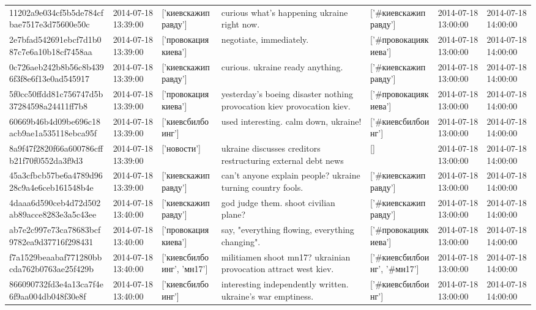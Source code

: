 \begin{tabular}{lllllll}
11202a9e034cf5b5de784cfbae7517e3d75600e50c & 2014-07-18 13:39:00 & ['киевскажиправду'] & curious what's happening ukraine right now. & ['#киевскажиправду'] & 2014-07-18 13:00:00 & 2014-07-18 14:00:00 \\
2e7bfad542691ebcf7d1b087c7e6a10b18cf7458aa & 2014-07-18 13:39:00 & ['провокациякиева'] & negotiate, immediately. & ['#провокациякиева'] & 2014-07-18 13:00:00 & 2014-07-18 14:00:00 \\
0c726aeb242b8b56c8b4396f3f8e6f13e0ad545917 & 2014-07-18 13:39:00 & ['киевскажиправду'] & curious. ukraine ready anything. & ['#киевскажиправду'] & 2014-07-18 13:00:00 & 2014-07-18 14:00:00 \\
5f0cc50ffdd81c756747d5b37284598a24411ff7b8 & 2014-07-18 13:39:00 & ['провокациякиева'] & yesterday's boeing disaster nothing provocation kiev provocation kiev. & ['#провокациякиева'] & 2014-07-18 13:00:00 & 2014-07-18 14:00:00 \\
60669b46b4d09be696c18acb9ae1a535118ebca95f & 2014-07-18 13:39:00 & ['киевсбилбоинг'] & used interesting. calm down, ukraine! & ['#киевсбилбоинг'] & 2014-07-18 13:00:00 & 2014-07-18 14:00:00 \\
8a9f47f2820f66a600786cffb21f70f0552da3f9d3 & 2014-07-18 13:39:00 & ['новости'] & ukraine discusses creditors restructuring external debt news & [] & 2014-07-18 13:00:00 & 2014-07-18 14:00:00 \\
45a3cfbcb57be6a4789d9628c9a4e6ceb161548b4e & 2014-07-18 13:39:00 & ['киевскажиправду'] & can't anyone explain people? ukraine turning country fools. & ['#киевскажиправду'] & 2014-07-18 13:00:00 & 2014-07-18 14:00:00 \\
4daaa6d590ceb4d72d502ab89acce8283e3a5c43ee & 2014-07-18 13:40:00 & ['киевскажиправду'] & god judge them. shoot civilian plane? & ['#киевскажиправду'] & 2014-07-18 13:00:00 & 2014-07-18 14:00:00 \\
ab7e2c997e73ca78683bcf9782ea9d37716f298431 & 2014-07-18 13:40:00 & ['провокациякиева'] & say, "everything flowing, everything changing". & ['#провокациякиева'] & 2014-07-18 13:00:00 & 2014-07-18 14:00:00 \\
f7a1529beaabaf771280bbcda762b0763ae25f429b & 2014-07-18 13:40:00 & ['киевсбилбоинг', 'мн17'] & militiamen shoot mn17? ukrainian provocation attract west kiev. & ['#киевсбилбоинг', '#мн17'] & 2014-07-18 13:00:00 & 2014-07-18 14:00:00 \\
866090732fd3e4a13ca7f4e6f9aa004db048f30e8f & 2014-07-18 13:40:00 & ['киевсбилбоинг'] & interesting independently written. ukraine's war emptiness. & ['#киевсбилбоинг'] & 2014-07-18 13:00:00 & 2014-07-18 14:00:00 \\

\end{tabular}
